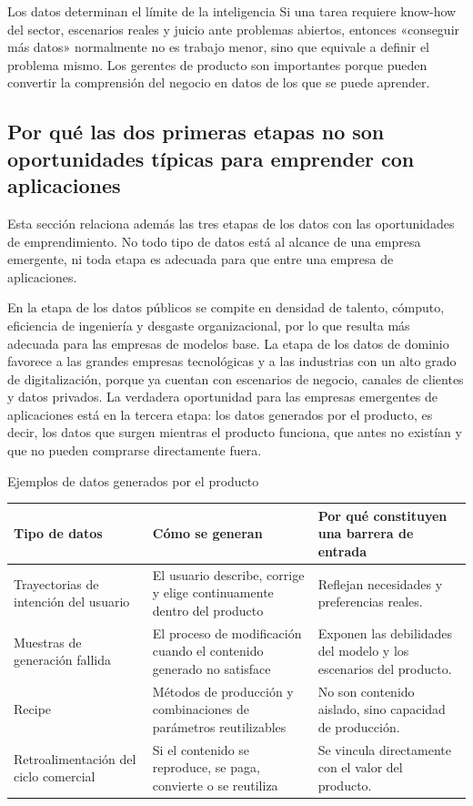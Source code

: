 \begin{importantbox}{Los datos determinan el límite de la inteligencia}
Si una tarea requiere know-how del sector, escenarios reales y juicio ante problemas abiertos, entonces «conseguir más datos» normalmente no es trabajo menor, sino que equivale a definir el problema mismo. Los gerentes de producto son importantes porque pueden convertir la comprensión del negocio en datos de los que se puede aprender.
\end{importantbox}

\subsection{Por qué las dos primeras etapas no son oportunidades típicas para emprender con aplicaciones}

Esta sección relaciona además las tres etapas de los datos con las oportunidades de emprendimiento. No todo tipo de datos está al alcance de una empresa emergente, ni toda etapa es adecuada para que entre una empresa de aplicaciones.

En la etapa de los datos públicos se compite en densidad de talento, cómputo, eficiencia de ingeniería y desgaste organizacional, por lo que resulta más adecuada para las empresas de modelos base. La etapa de los datos de dominio favorece a las grandes empresas tecnológicas y a las industrias con un alto grado de digitalización, porque ya cuentan con escenarios de negocio, canales de clientes y datos privados. La verdadera oportunidad para las empresas emergentes de aplicaciones está en la tercera etapa: los datos generados por el producto, es decir, los datos que surgen mientras el producto funciona, que antes no existían y que no pueden comprarse directamente fuera.

\begin{knowledgebox}{Ejemplos de datos generados por el producto}
\begin{tabularx}{\textwidth}{p{}p{}X}
\toprule
Tipo de datos & Cómo se generan & Por qué constituyen una barrera de entrada \\
\midrule
Trayectorias de intención del usuario & El usuario describe, corrige y elige continuamente dentro del producto & Reflejan necesidades y preferencias reales. \\
Muestras de generación fallida & El proceso de modificación cuando el contenido generado no satisface & Exponen las debilidades del modelo y los escenarios del producto. \\
Recipe & Métodos de producción y combinaciones de parámetros reutilizables & No son contenido aislado, sino capacidad de producción. \\
Retroalimentación del ciclo comercial & Si el contenido se reproduce, se paga, convierte o se reutiliza & Se vincula directamente con el valor del producto. \\
\bottomrule
\end{tabularx}
\end{knowledgebox}

